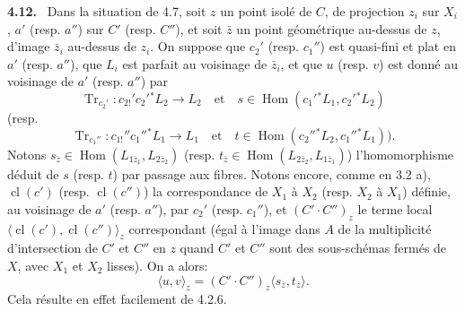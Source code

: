 \documentclass[11pt]{article}
\newenvironment{statement}[1]{\par\medskip\noindent\textbf{#1.}\ }{\par\medskip}
\DeclareMathOperator{\Hom}{Hom}
\providecommand{\cl}{\operatorname{cl}}
\providecommand{\Tr}{\operatorname{Tr}}
\providecommand{\Tr}{\operatorname{Tr}}
\providecommand{\Tr}{\operatorname{Tr}}
\providecommand{\Hom}{\operatorname{Hom}}
\providecommand{\Tr}{\operatorname{Tr}}
\providecommand{\cl}{\operatorname{cl}}
\providecommand{\Hom}{\operatorname{Hom}}
\providecommand{\cl}{\operatorname{cl}}
\providecommand{\Tr}{\operatorname{Tr}}
\begin{document}
\begin{statement}{4.12}
Dans la situation de 4.7, soit $z$ un point isolé de $C$, de projection $z_i$ sur $X_i$, $a'$ (resp. $a''$) sur $C'$ (resp. $C''$), et soit $\bar z$ un point géométrique au-dessus de $z$, d'image $\bar z_i$ au-dessus de $z_i$. On suppose que $c_2'$ (resp. $c_1''$) est quasi-fini et plat en $a'$ (resp. $a''$), que $L_i$ est parfait au voisinage de $\bar z_i$, et que $u$ (resp. $v$) est donné au voisinage de $a'$ (resp. $a''$) par
\[
\Tr_{c_2'}:c_{2!}'c_2'{}^*L_2\longrightarrow L_2
\quad\text{et}\quad
s\in\Hom(c_1'{}^*L_1,c_2'{}^*L_2)
\]
(resp.
\[
\Tr_{c_1''}:c_{1!}''c_1''{}^*L_1\longrightarrow L_1
\quad\text{et}\quad
t\in\Hom(c_2''{}^*L_2,c_1''{}^*L_1)).
\]
Notons $s_{\bar z}\in\Hom(L_{1\bar z_1},L_{2\bar z_2})$ (resp. $t_{\bar z}\in\Hom(L_{2\bar z_2},L_{1\bar z_1})$) l'homomorphisme déduit de $s$ (resp. $t$) par passage aux fibres. Notons encore, comme en 3.2 a), $\cl(c')$ (resp. $\cl(c'')$) la correspondance de $X_1$ à $X_2$ (resp. $X_2$ à $X_1$) définie, au voisinage de $a'$ (resp. $a''$), par $c_2'$ (resp. $c_1''$), et $(C'\!\cdot C'')_z$ le terme local $\langle\cl(c'),\cl(c'')\rangle_z$ correspondant (égal à l'image dans $A$ de la multiplicité d'intersection de $C'$ et $C''$ en $z$ quand $C'$ et $C''$ sont des sous-schémas fermés de $X$, avec $X_1$ et $X_2$ lisses). On a alors:
\begin{equation}
\tag{4.12.1}
\langle u,v\rangle_z=(C'\!\cdot C'')_z\langle s_{\bar z},t_{\bar z}\rangle.
\end{equation}
Cela résulte en effet facilement de 4.2.6.
\end{statement}
\end{document}
